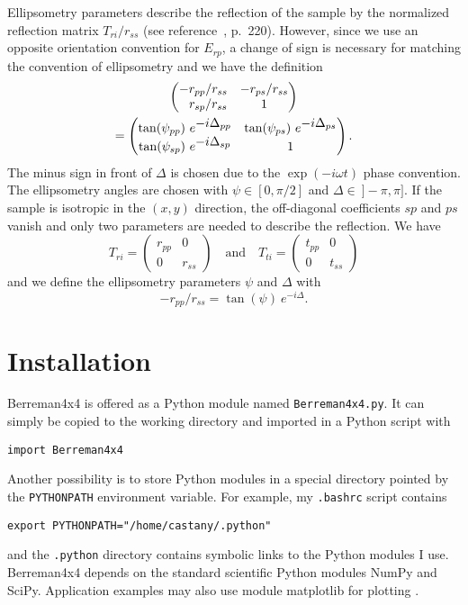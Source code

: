 Ellipsometry parameters describe the reflection of the sample by the normalized reflection matrix $T_{ri}/r_{ss}$ (see reference~, p.~220).
However, since we use an opposite orientation convention for $E_{rp}$, a change of sign is necessary for matching the convention of ellipsometry and we have the definition
\begin{multline*}
\begin{pmatrix}
-r_{pp}/r_{ss} & -r_{ps}/r_{ss} \\
\hphantom{-}r_{sp}/r_{ss} & 1 
\end{pmatrix} \\
=
\begin{pmatrix}
\tan(\psi_{pp})\ e^{\displaystyle -i\Delta_{pp}} & 
\tan(\psi_{ps})\ e^{\displaystyle -i\Delta_{ps}} \\
\tan(\psi_{sp})\ e^{\displaystyle -i\Delta_{sp}} &
1
\end{pmatrix}.
\end{multline*}
The minus sign in front of $\Delta$ is chosen due to the $\exp(-i\omega t)$ phase convention.
The ellipsometry angles are chosen with $\psi\in[0,\pi/2]$ and $\Delta\in\ ]-\pi,\pi]$.
If the sample is isotropic in the $(x,y)$ direction, the off-diagonal coefficients $sp$ and $ps$ vanish and only two parameters are needed to describe the reflection.
We have
$$
T_{ri} =
\begin{pmatrix}
r_{pp} & 0\\
0 & r_{ss}
\end{pmatrix}
\quad\mathrm{and}\quad
T_{ti} =
\begin{pmatrix}
t_{pp} & 0\\
0 & t_{ss}
\end{pmatrix}
$$
and we define the ellipsometry parameters $\psi$ and $\Delta$ with 
$$
-r_{pp}/r_{ss} = \tan(\psi)\ e^{\displaystyle -i\Delta}.
$$

\section{Installation}

Berreman4x4 is offered as a Python module named \verb/Berreman4x4.py/.
It can simply be copied to the working directory and imported in a Python script with
\begin{verbatim}
import Berreman4x4
\end{verbatim}
Another possibility is to store Python modules in a special directory pointed by the \verb/PYTHONPATH/ environment variable.
For example, my \verb/.bashrc/ script contains
\begin{verbatim}
export PYTHONPATH="/home/castany/.python"
\end{verbatim}
and the \verb/.python/ directory contains symbolic links to the Python modules I use. 
%
Berreman4x4 depends on the standard scientific Python modules NumPy and SciPy.
Application examples may also use module matplotlib for plotting \cite{NumPy, SciPy, matplotlib}.


